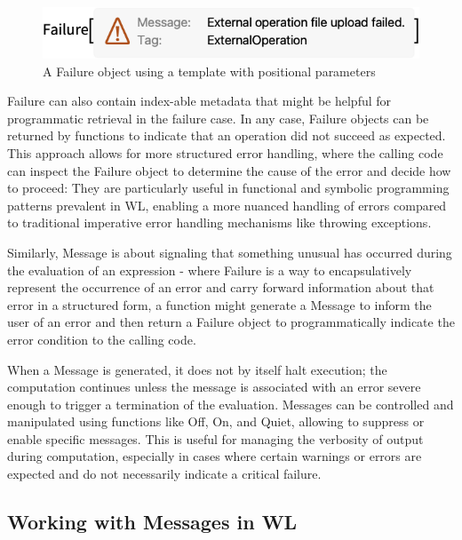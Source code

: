 \begin{figure}[h]
    \centering
    \includegraphics[scale=0.5]{images/closing/O_6.png}
    \caption{A Failure object using a template with positional parameters \cite{noauthor_failurewolfram_nodate}}
    \label{fig:templated-failure}
\end{figure}

Failure can also contain index-able metadata that might be helpful for programmatic retrieval in the failure case. \cite{noauthor_failurewolfram_nodate} In any case, Failure objects can be returned by functions to indicate that an operation did not succeed as expected. This approach allows for more structured error handling, where the calling code can inspect the Failure object to determine the cause of the error and decide how to proceed: They are particularly useful in functional and symbolic programming patterns prevalent in WL, enabling a more nuanced handling of errors compared to traditional imperative error handling mechanisms like throwing exceptions.

Similarly, Message \cite{noauthor_messagewolfram_nodate} is about signaling that something unusual has occurred during the evaluation of an expression - where Failure is a way to encapsulatively represent the occurrence of an error and carry forward information about that error in a structured form, a function might generate a Message to inform the user of an error and then return a Failure object to programmatically indicate the error condition to the calling code.

When a Message is generated, it does not by itself halt execution; the computation continues unless the message is associated with an error severe enough to trigger a termination of the evaluation. \cite{noauthor_messagewolfram_nodate} Messages can be controlled and manipulated using functions like Off, On, and Quiet, allowing to suppress or enable specific messages. This is useful for managing the verbosity of output during computation, especially in cases where certain warnings or errors are expected and do not necessarily indicate a critical failure.

\subsection{Working with Messages in WL}

